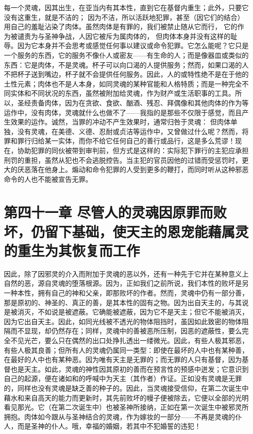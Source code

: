 每一个灵魂，因其出生，在亚当内有其本性，直到它在基督内重生；此外，只要它没有这重生，就是不洁的； 因为不洁，所以活跃地犯罪，甚至（因它们的结合）用自己的羞耻沾染了肉体。虽然肉体是有罪的，我们被禁止随从它而行， 它的作为被谴责为与圣神争战，人因它被斥为属肉体的， 但肉体本身并没有这样的耻辱。因为它本身并不会思考或感觉任何事以建议或命令犯罪。它怎么能呢？它只是一个服务的东西，它的服务不像仆人或密友——有生命的人；而是像器皿或类似的东西：它是肉体，不是灵魂。杯子可以向口渴的人提供服务；然而，如果口渴的人不把杯子送到嘴边，杯子就不会提供任何服务。因此，人的或特性绝不是在于他的土性元素；肉体也不是人本身，如同灵魂的某种官能和人格特质；而是一种完全不同实体和不同状况的东西，虽然被附加给灵魂，作为财产或生活职事的工具。所以，圣经责备肉体，因为在贪欲、食欲、酗酒、残忍、拜偶像和其他肉体的作为等运作中，没有肉体，灵魂就什么也做不了——我指的是那些不仅限于感觉，而且产生效果的运作。诚然，当罪的冲动不产生效果时，通常归咎于灵魂： 但肉体单独，没有灵魂，在美德、义德、忍耐或贞洁等运作中，又曾做过什么呢？然而，将罪和罪行归给某一实体，而你不给它任何自己的善行或品行，这是多么荒谬！现在，协助犯罪的同伙被带到审判前，但方式是这样的：实际犯下罪行的主犯应承担刑罚的重担，虽然从犯也不会逃脱控告。当主犯的官员因他的过错而受惩罚时，更大的厌恶落在他身上。煽动和命令犯罪的人受到更多的鞭打，而同时听从这种邪恶命令的人也不能被宣告无罪。\par


\section{第四十一章 尽管人的灵魂因原罪而败坏，仍留下基础，使天主的恩宠能藉属灵的重生为其恢复而工作}

因此，除了因邪灵的介入而附加于灵魂的恶以外，还有一种先于它并在某种意义上自然的恶，源自灵魂的堕落根源。因为，正如我们之前所说，我们本性的败坏是另一种本性，拥有自己的神和父亲，即那败坏的作者。然而，灵魂中仍有一部分善，那是原初的、神圣的、真正的善，是其本性的固有之物。因为出自天主的，与其说是被消灭，不如说是被遮蔽。它确能被遮蔽，因为它不是天主；但它不能被消灭，因为它出自天主。因此，如同光线被不透光的物体阻挡时，虽因如此致密的物体阻隔而不显现，却仍然存在；同样，灵魂中的善被恶所压制，因恶的遮蔽性，要么完全不见光芒，要么只在偶然的出口处挣扎透出一缕微光。因此，有些人极其邪恶，有些人极其良善；但所有人的灵魂仍属同一类型：即使在最坏的人中也有某种善，在最好的人中也有某种恶。因为唯有天主是无罪的；而无罪的人只有基督，因为基督也是天主。如此，灵魂的神性因其原初的善而在预言性的预感中迸发；它意识到自己的起源，便在诸如和的呼喊中为天主（其作者）作证。正如没有灵魂是无罪的，同样也没有灵魂是缺乏善的种子的。因此，当灵魂接受信仰，在第二次诞生中藉水和来自高天的能力而更新时，其先前败坏的幔子便被除去，它便以全部的光明看见那光。它（在第二次诞生中）也被圣神所接纳，正如在第一次诞生中被邪灵所拥抱。肉体如今跟从与圣神结合的灵魂，作为嫁妆的一部分——不再是灵魂的仆人，而是圣神的仆人。哦，幸福的婚姻，若其中不犯婚誓的违犯！\par

